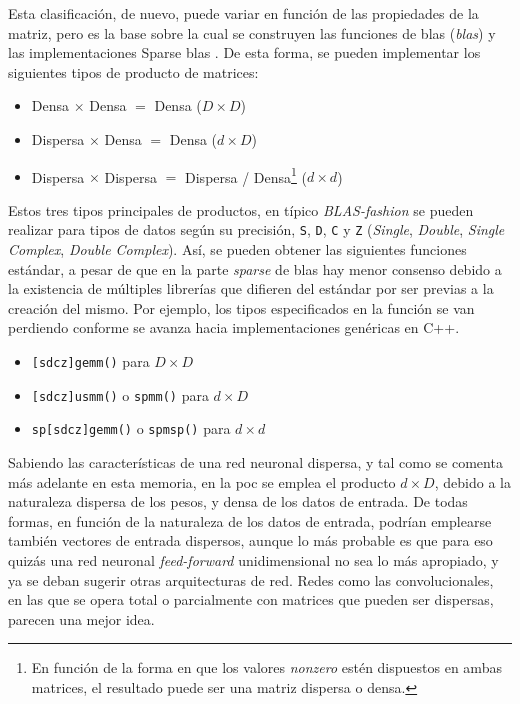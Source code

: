 Esta clasificación, de nuevo, puede variar en función de las propiedades de la matriz, pero es la base sobre la cual se construyen las funciones de \acrshort{blas} (\textit{\acrlong{blas}}) \cite{netlib_blas} y las implementaciones Sparse \acrshort{blas} \cite{sparse_blas_10.1145/567806.567810}. De esta forma, se pueden implementar los siguientes tipos de producto de matrices:

\begin{itemize}
    \item Densa $\times$ Densa $=$ Densa ($D\times D$)
    \item Dispersa $\times$ Densa $=$ Densa ($d\times D$)
    \item Dispersa $\times$ Dispersa $=$ Dispersa / Densa\footnote{En función de la forma en que los valores \textit{nonzero} estén dispuestos en ambas matrices, el resultado puede ser una matriz dispersa o densa.} ($d\times d$)
\end{itemize}

Estos tres tipos principales de productos, en típico \textit{BLAS-fashion} se pueden realizar para tipos de datos según su precisión, \texttt{S}, \texttt{D}, \texttt{C} y \texttt{Z} (\textit{Single}, \textit{Double}, \textit{Single Complex}, \textit{Double Complex}).
Así, se pueden obtener las siguientes funciones estándar, a pesar de que en la parte \textit{sparse} de \acrshort{blas} hay menor consenso debido a la existencia de múltiples librerías que difieren del estándar por ser previas a la creación del mismo. Por ejemplo, los tipos especificados en la función se van perdiendo conforme se avanza hacia implementaciones genéricas en C++.

\begin{itemize}
    \item \texttt{[sdcz]gemm()} para $D\times D$
    \item \texttt{[sdcz]usmm()} o \texttt{spmm()} para $d\times D$
    \item \texttt{sp[sdcz]gemm()} o \texttt{spmsp()} para $d\times d$
\end{itemize}

Sabiendo las características de una red neuronal dispersa, y tal como se comenta más adelante en esta memoria, en la \acrshort{poc} se emplea el producto $d\times D$, debido a la naturaleza dispersa de los pesos, y densa de los datos de entrada. De todas formas, en función de la naturaleza de los datos de entrada, podrían emplearse también vectores de entrada dispersos, aunque lo más probable es que para eso quizás una red neuronal \textit{feed-forward} unidimensional no sea lo más apropiado, y ya se deban sugerir otras arquitecturas de red. Redes como las convolucionales, en las que se opera total o parcialmente con matrices que pueden ser dispersas, parecen una mejor idea.

